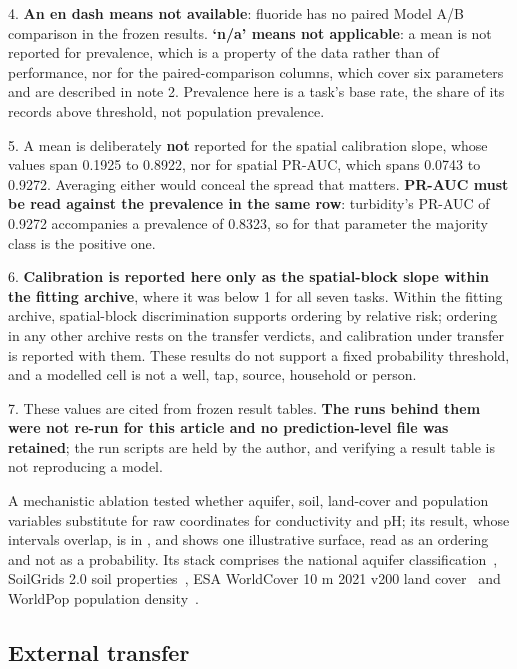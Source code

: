 \documentclass[10pt,letterpaper]{article}
\begin{document}
\begin{table}[!ht]
{\begin{flushleft}
4. \textbf{An en dash means not available}: fluoride has no paired Model A/B comparison in the frozen results. \textbf{`n/a' means not applicable}: a mean is not reported for prevalence, which is a property of the data rather than of performance, nor for the paired-comparison columns, which cover six parameters and are described in note 2. Prevalence here is a task's base rate, the share of its records above threshold, not population prevalence.

5. A mean is deliberately \textbf{not} reported for the spatial calibration slope, whose values span 0.1925 to 0.8922, nor for spatial PR-AUC, which spans 0.0743 to 0.9272. Averaging either would conceal the spread that matters. \textbf{PR-AUC must be read against the prevalence in the same row}: turbidity's PR-AUC of 0.9272 accompanies a prevalence of 0.8323, so for that parameter the majority class is the positive one.

6. \textbf{Calibration is reported here only as the spatial-block slope within the fitting archive}, where it was below 1 for all seven tasks. Within the fitting archive, spatial-block discrimination supports ordering by relative risk; ordering in any other archive rests on the transfer verdicts, and calibration under transfer is reported with them. These results do not support a fixed probability threshold, and a modelled cell is not a well, tap, source, household or person.

7. These values are cited from frozen result tables. \textbf{The runs behind them were not re-run for this article and no prediction-level file was retained}; the run scripts are held by the author, and verifying a result table is not reproducing a model.
\end{flushleft}
}
\label{table3}
\end{table}

A mechanistic ablation tested whether aquifer, soil, land-cover and population variables substitute for raw coordinates for conductivity and pH; its result, whose intervals overlap, is in , and  shows one illustrative surface, read as an ordering and not as a probability. Its stack comprises the national aquifer classification~\cite{CGWB-ManualAquiferMapping}, SoilGrids 2.0 soil properties~\cite{Poggio2021}, ESA WorldCover 10 m 2021 v200 land cover~\cite{Zanaga2022} and WorldPop population density~\cite{WorldPop2020}.

\subsection*{External transfer}
\end{document}
